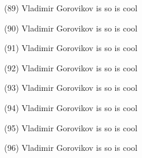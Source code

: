 \documentclass{article}%
\begin{document}
\begin{minipage}{0.3333333333333333\textwidth}%
(89) Vladimir Gorovikov%
\newline%
%
is so%
\newline%
%
is cool%
\newline%
%
\end{minipage}%
\begin{minipage}{0.3333333333333333\textwidth}%
(90) Vladimir Gorovikov%
\newline%
%
is so%
\newline%
%
is cool%
\newline%
%
\end{minipage}%
\newline%
\begin{minipage}{0.3333333333333333\textwidth}%
(91) Vladimir Gorovikov%
\newline%
%
is so%
\newline%
%
is cool%
\newline%
%
\end{minipage}%
\begin{minipage}{0.3333333333333333\textwidth}%
(92) Vladimir Gorovikov%
\newline%
%
is so%
\newline%
%
is cool%
\newline%
%
\end{minipage}%
\begin{minipage}{0.3333333333333333\textwidth}%
(93) Vladimir Gorovikov%
\newline%
%
is so%
\newline%
%
is cool%
\newline%
%
\end{minipage}%
\newline%
\begin{minipage}{0.3333333333333333\textwidth}%
(94) Vladimir Gorovikov%
\newline%
%
is so%
\newline%
%
is cool%
\newline%
%
\end{minipage}%
\begin{minipage}{0.3333333333333333\textwidth}%
(95) Vladimir Gorovikov%
\newline%
%
is so%
\newline%
%
is cool%
\newline%
%
\end{minipage}%
\begin{minipage}{0.3333333333333333\textwidth}%
(96) Vladimir Gorovikov%
\newline%
%
is so%
\newline%
%
is cool%
\newline%
%
\end{minipage}%
\end{document}
